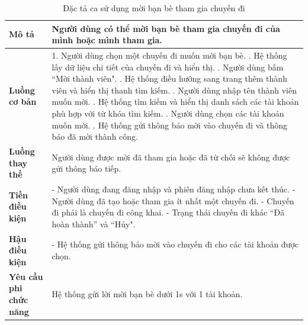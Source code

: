 \begin{longtable}{| p{4cm} | p{\dimexpr\linewidth-4cm-4\tabcolsep} |} %
    \caption{Đặc tả ca sử dụng mời bạn bè tham gia chuyến đi} %
    \label{tab:uc_invite_friend_spec} \\ %

    \hline
    \textbf{Mô tả} & Người dùng có thể mời bạn bè tham gia chuyến đi của mình hoặc mình tham gia. \\
    \hline
    \endfirsthead %



    \hline %
    \endlastfoot

    \textbf{Luồng cơ bản} & 1. Người dùng chọn một chuyến đi muốn mời bạn bè. \newline
                           2. Hệ thống lấy dữ liệu chi tiết của chuyến đi và hiển thị. \newline
                           3. Người dùng bấm ``Mời thành viên". \newline
                           4. Hệ thống điều hướng sang trang thêm thành viên và hiển thị thanh tìm kiếm. \newline
                           5. Người dùng nhập tên thành viên muốn mời. \newline
                           6. Hệ thống tìm kiếm và hiển thị danh sách các tài khoản phù hợp với từ khóa tìm kiếm. \newline
                           7. Người dùng chọn các tài khoản muốn mời. \newline
                           8. Hệ thống gửi thông báo mời vào chuyến đi và thông báo đã mời thành công. \\
    \hline
    \textbf{Luồng thay thế} & Người dùng được mời đã tham gia hoặc đã từ chối sẽ không được gửi thông báo tiếp. \\
    \hline
    \textbf{Tiền điều kiện} & - Người dùng đang đăng nhập và phiên đăng nhập chưa kết thúc.\newline
                           - Người dùng đã tạo hoặc tham gia ít nhất một chuyến đi. \newline
                           - Chuyến đi phải là chuyến đi công khai.\newline
                           - Trạng thái chuyến đi khác ``Đã hoàn thành'' và ``Hủy". \\
    \hline
    \textbf{Hậu điều kiện} & - Hệ thống gửi thông báo mời vào chuyến đi cho các tài khoản được chọn. \\
    \hline
    \textbf{Yêu cầu phi chức năng} & Hệ thống gửi lời mời bạn bè dưới 1s với 1 tài khoản. \\

\end{longtable}
\vspace{0.8cm}

